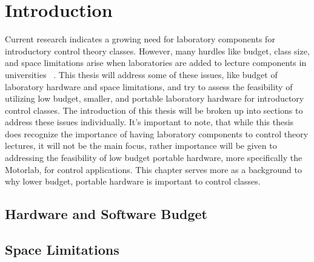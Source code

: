 
\cleardoublepage


\chapter{Introduction}
\label{makereference1}

Current research indicates a growing need for laboratory components for introductory control theory classes. However, many hurdles like budget, class size, and space limitations arise when laboratories are added to lecture components in universities ~\citep{2}. This thesis will address some of these issues, like budget of laboratory hardware and space limitations, and try to assess the feasibility of utilizing low budget, smaller, and portable laboratory hardware for introductory control classes. The introduction of this thesis will be broken up into sections to address these issues individually. It's important to note, that while this thesis does recognize the importance of having laboratory components to control theory lectures, it will not be the main focus, rather importance will be given to addressing the feasibility of low budget portable hardware, more specifically the Motorlab, for control applications. This chapter serves more as a background to why lower budget, portable hardware is important to control classes. 

\section{Hardware and Software Budget}
\label{makereference1.1}

\section{Space Limitations}
\label{makereference1.2}